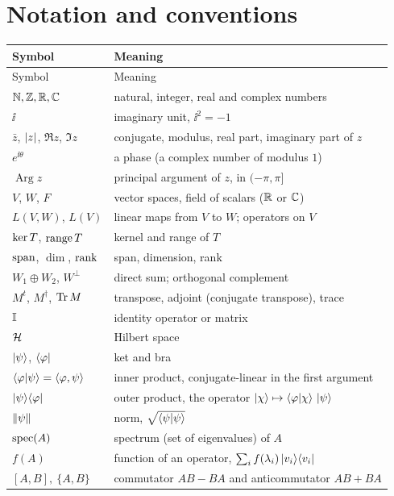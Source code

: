 \chapter{Notation and conventions}\label{app:notation}

{\small
\begin{longtable}{@{}p{}p{}@{}}
  \toprule
  Symbol & Meaning\\
  \midrule
\endfirsthead
  \toprule
  Symbol & Meaning\\
  \midrule
\endhead
  $\mathbb{N},\mathbb{Z},\mathbb{R},\mathbb{C}$ & natural, integer, real and complex numbers\\
  $\ii$ & imaginary unit, $\ii^2=-1$\\
  $\bar z$, $\left|z\right|$, $\Re z$, $\Im z$ & conjugate, modulus, real part, imaginary part of $z$\\
  $e^{\ii\theta}$ & a phase (a complex number of modulus $1$)\\
  $\operatorname{Arg}z$ & principal argument of $z$, in $(-\pi,\pi]$\\
  \midrule
  $V$, $W$, $F$ & vector spaces, field of scalars ($\mathbb{R}$ or $\mathbb{C}$)\\
  $L(V,W)$, $L(V)$ & linear maps from $V$ to $W$; operators on $V$\\
  $\operatorname{ker} T$, $\operatorname{range} T$ & kernel and range of $T$\\
  $\operatorname{span}$, $\dim$, $\operatorname{rank}$ & span, dimension, rank\\
  $W_1\oplus W_2$, $W^\perp$ & direct sum; orthogonal complement\\
  $M^t$, $M^\dagger$, $\operatorname{Tr} M$ & transpose, adjoint (conjugate transpose), trace\\
  $\mathbb{I}$ & identity operator or matrix\\
  \midrule
  $\mathcal{H}$ & Hilbert space\\
  $\left|\psi\right\rangle$, $\left\langle\varphi\right|$ & ket and bra\\
  $\left\langle\varphi\middle|\psi\right\rangle=\langle\varphi,\psi\rangle$ & inner product, conjugate-linear in the first argument\\
  $\left|\psi\right\rangle\!\left\langle\varphi\right|$ & outer product, the operator $\left|\chi\right\rangle\mapsto\left\langle\varphi\middle|\chi\right\rangle\,\left|\psi\right\rangle$\\
  $\left\|\psi\right\|$ & norm, $\sqrt{\left\langle\psi\middle|\psi\right\rangle}$\\
  $\operatorname{spec}(A)$ & spectrum (set of eigenvalues) of $A$\\
  $f(A)$ & function of an operator, $\sum_if(\lambda_i)\left|v_i\right\rangle\!\left\langle v_i\right|$\\
  $[A,B],\ \{A,B\}$ & commutator $AB-BA$ and anticommutator $AB+BA$\\

\end{longtable}}
